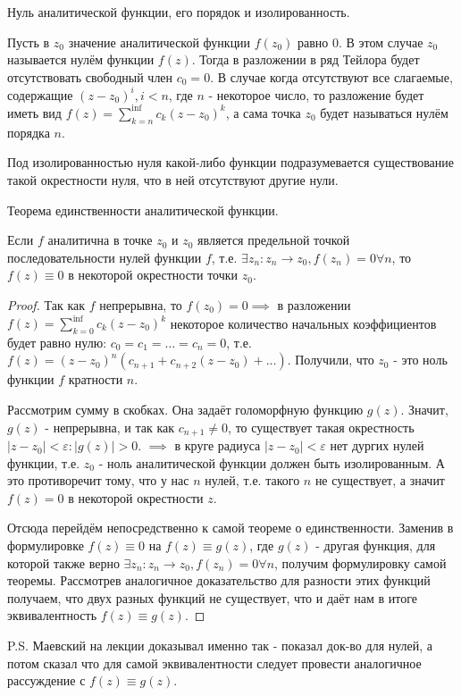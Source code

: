 Нуль аналитической функции, его порядок и изолированность.

Пусть в $z_0$ значение аналитической функции $f(z_0)$ равно 0. В этом случае $z_0$ называется нулём функции $f(z)$. Тогда в разложении в ряд Тейлора будет отсутствовать свободный член $c_0=0$. В случае когда отсутствуют все слагаемые, содержащие $(z - z_0)^i, i < n$, где $n$ - некоторое число, то разложение будет иметь вид $f(z) = \sum_{k=n}^{\inf}c_k(z-z_0)^k$, а сама точка $z_0$ будет называться нулём порядка $n$.

Под изолированностью нуля какой-либо функции подразумевается существование такой окрестности нуля, что в ней отсутствуют другие нули.

\begin{theorem}
	Теорема единственности аналитической функции.
	
	Если $f$ аналитична в точке $z_0$ и $z_0$ является предельной точкой последовательности нулей функции $f$, т.е. $\exists{z_n}: z_n \rightarrow z_0, f(z_n) = 0 \forall n$, то $f(z)\equiv0$ в некоторой окрестности точки $z_0$.
\end{theorem}

\begin{proof}
	Так как $f$ непрерывна, то $f(z_0) = 0 \implies$ в разложении $f(z) = \sum_{k=0}^{\inf} c_k(z-z_0)^k$ некоторое количество начальных коэффициентов будет равно нулю: $c_0 = c_1 = \dots = c_n = 0$, т.е. $f(z) = (z-z_0)^n (c_{n+1} + c_{n+2}(z-z_0) + \dots)$. Получили, что $z_0$ - это ноль функции $f$ кратности $n$.
	
	Рассмотрим сумму в скобках. Она задаёт голоморфную функцию $g(z)$. Значит, $g(z)$ - непрерывна, и так как $c_{n+1} \neq 0$, то существует такая окрестность $|z - z_0| < \varepsilon: |g(z)| > 0$. $\implies$ в круге радиуса $|z-z_0| < \varepsilon$ нет дургих нулей функции, т.е. $z_0$ - ноль аналитической функции должен быть изолированным. А это противоречит тому, что у нас $n$ нулей, т.е. такого $n$ не существует, а значит $f(z) = 0$ в некоторой окрестности $z$.
	
	Отсюда перейдём непосредственно к самой теореме о единственности. Заменив в формулировке $f(z) \equiv 0$ на $f(z) \equiv g(z)$, где $g(z)$ - другая функция, для которой также верно  $\exists{z_n}: z_n \rightarrow z_0, f(z_n) = 0 \forall n$, получим формулировку самой теоремы. Рассмотрев аналогичное доказательство для разности этих функций получаем, что двух разных функций не существует, что и даёт нам в итоге эквивалентность $f(z) \equiv g(z)$.
\end{proof}

P.S. Маевский на лекции доказывал именно так - показал док-во для нулей, а потом сказал что для самой эквивалентности следует провести аналогичное рассуждение с $f(z) \equiv g(z)$.